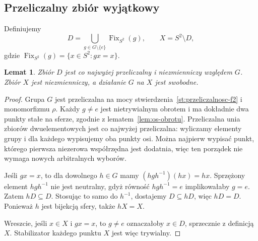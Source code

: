 \documentclass[11pt,a4paper]{article}
\numberwithin{equation}{section}
\theoremstyle{plain}
\newtheorem{lemat}[twierdzenie]{Lemat}
\theoremstyle{definition}
\theoremstyle{remark}
\newcommand{\Fix}{\operatorname{Fix}}
\begin{document}
\subsection{Przeliczalny zbiór wyjątkowy}
Definiujemy
\begin{equation}\label{eq:6-1}
 D=\bigcup_{g\in G\setminus\{e\}}\Fix_{S^2}(g),\qquad X=S^2\setminus D,
\end{equation}
gdzie $\Fix_{S^2}(g)=\{x\in S^2:gx=x\}$.
\begin{lemat}\label{lem:wyjatkowy}
Zbiór $D$ jest co najwyżej przeliczalny i niezmienniczy względem $G$. Zbiór $X$ jest niezmienniczy, a działanie $G$ na $X$ jest swobodne.
\end{lemat}
\begin{proof}
Grupa $G$ jest przeliczalna na mocy stwierdzenia~\ref{st:przeliczalnosc-f2} i monomorfizmu $\rho$. Każdy $g\ne e$ jest nietrywialnym obrotem i ma dokładnie dwa punkty stałe na sferze, zgodnie z lematem~\ref{lem:os-obrotu}. Przeliczalna unia zbiorów dwuelementowych jest co najwyżej przeliczalna: wyliczamy elementy grupy i dla każdego wypisujemy oba punkty osi. Można najpierw wypisać punkt, którego pierwsza niezerowa współrzędna jest dodatnia, więc ten porządek nie wymaga nowych arbitralnych wyborów.

Jeśli $gx=x$, to dla dowolnego $h\in G$ mamy $(hgh^{-1})(hx)=hx$. Sprzężony element $hgh^{-1}$ nie jest neutralny, gdyż równość $hgh^{-1}=e$ implikowałaby $g=e$. Zatem $hD\subseteq D$. Stosując to samo do $h^{-1}$, dostajemy $D\subseteq hD$, więc $hD=D$. Ponieważ $h$ jest bijekcją sfery, także $hX=X$.

Wreszcie, jeśli $x\in X$ i $gx=x$, to $g\ne e$ oznaczałoby $x\in D$, sprzecznie z definicją $X$. Stabilizator każdego punktu $X$ jest więc trywialny.
\end{proof}
\end{document}
